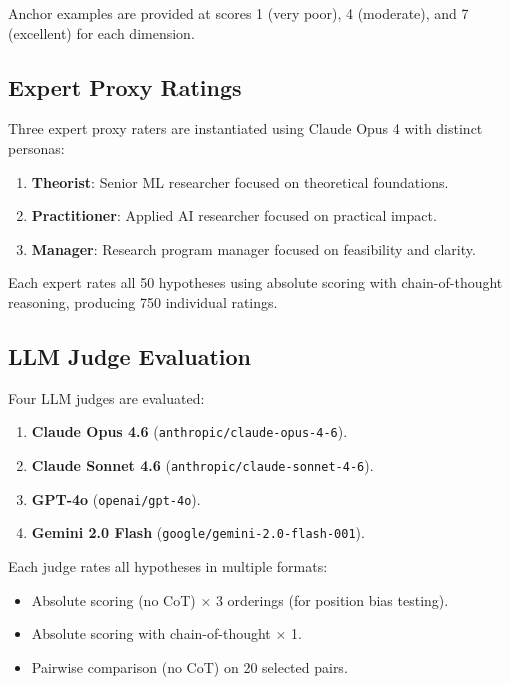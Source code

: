 \documentclass[11pt,a4paper]{article}
\begin{document}
Anchor examples are provided at scores 1 (very poor), 4 (moderate), and 7
(excellent) for each dimension.

\subsection{Expert Proxy Ratings}
\label{sec:expert-proxy}

Three expert proxy raters are instantiated using Claude Opus 4 with
distinct personas:

\begin{enumerate}
  \item \textbf{Theorist}: Senior ML researcher focused on theoretical
        foundations.
  \item \textbf{Practitioner}: Applied AI researcher focused on practical
        impact.
  \item \textbf{Manager}: Research program manager focused on feasibility
        and clarity.
\end{enumerate}

Each expert rates all 50 hypotheses using absolute scoring with
chain-of-thought reasoning, producing 750 individual ratings.

\subsection{LLM Judge Evaluation}
\label{sec:judges}

Four LLM judges are evaluated:

\begin{enumerate}
  \item \textbf{Claude Opus 4.6} (\texttt{anthropic/claude-opus-4-6}).
  \item \textbf{Claude Sonnet 4.6} (\texttt{anthropic/claude-sonnet-4-6}).
  \item \textbf{GPT-4o} (\texttt{openai/gpt-4o}).
  \item \textbf{Gemini 2.0 Flash} (\texttt{google/gemini-2.0-flash-001}).
\end{enumerate}

Each judge rates all hypotheses in multiple formats:
\begin{itemize}
  \item Absolute scoring (no CoT) $\times$ 3 orderings (for position bias
        testing).
  \item Absolute scoring with chain-of-thought $\times$ 1.
  \item Pairwise comparison (no CoT) on 20 selected pairs.
\end{itemize}
\end{document}
